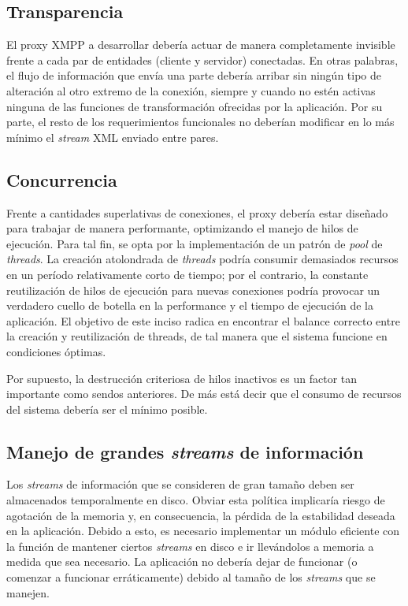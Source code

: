 \documentclass[a4paper,10pt]{article}
\begin{document}
\subsection{Transparencia}
El proxy XMPP a desarrollar debería actuar de manera completamente invisible frente a cada par de entidades (cliente y servidor) conectadas.
En otras palabras, el flujo de información que envía una parte debería arribar sin ningún tipo de alteración al otro extremo
de la conexión, siempre y cuando no estén activas ninguna de las funciones de transformación ofrecidas por la aplicación. Por su parte, el resto
de los requerimientos funcionales no deberían modificar en lo más mínimo el \textit{stream} XML enviado entre pares.

\subsection{Concurrencia}
Frente a cantidades superlativas de conexiones, el proxy debería estar diseñado para trabajar de manera performante, optimizando el manejo de hilos de ejecución.
Para tal fin, se opta por la implementación de un patrón de \textit{pool} de \textit{threads}. La creación atolondrada de \textit{threads} podría consumir demasiados recursos
en un período relativamente corto de tiempo; por el contrario, la constante reutilización de hilos de ejecución para nuevas conexiones podría provocar un verdadero
cuello de botella en la performance y el tiempo de ejecución de la aplicación. El objetivo de este inciso radica en encontrar el balance correcto entre la creación y reutilización de threads,
de tal manera que el sistema funcione en condiciones óptimas.

Por supuesto, la destrucción criteriosa de hilos inactivos es un factor tan importante como sendos anteriores. De más está decir que el consumo de recursos del sistema debería
ser el mínimo posible.

\subsection{Manejo de grandes \textit{streams} de información}
Los \textit{streams} de información que se consideren de gran tamaño deben ser almacenados temporalmente en disco. Obviar esta política implicaría riesgo de agotación de la memoria y, en consecuencia,
la pérdida de la estabilidad deseada en la aplicación. Debido a esto, es necesario implementar un módulo eficiente con la función de mantener ciertos \textit{streams}
en disco e ir llevándolos a memoria a medida que sea necesario. La aplicación no debería dejar de funcionar (o comenzar a funcionar erráticamente) debido al tamaño de los
\textit{streams} que se manejen.
\end{document}
